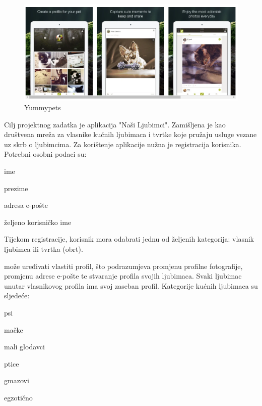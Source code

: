 		\begin{figure}[H]
			\includegraphics[scale=0.4]{slike/Yummypets.PNG} %
			\centering
			\caption{Yummypets}
			\label{fig:promjene}
		\end{figure}
	
		\par Cilj projektnog zadatka je aplikacija "Naši Ljubimci". Zamišljena je kao društvena mreža za vlasnike kućnih ljubimaca i tvrtke koje pružaju usluge vezane uz skrb o ljubimcima. Za korištenje aplikacije nužna je registracija korisnika. Potrebni osobni podaci su:
		
		
		\begin{packed_item}
			\item ime
			\item prezime
			\item adresa e-pošte
			\item željeno korisničko ime
		\end{packed_item}
		
		\par Tijekom registracije, korisnik mora odabrati jednu od željenih kategorija: vlasnik ljubimca ili tvrtka (obrt). 
		\par {} može uređivati vlastiti profil, što podrazumjeva promjenu profilne fotografije, promjenu adrese e-pošte te stvaranje profila svojih ljubimaca. Svaki ljubimac unutar vlasnikovog profila ima svoj zaseban profil. Kategorije kućnih ljubimaca su sljedeće:
		
		\begin{packed_item}
			\item psi
			\item mačke
			\item mali glodavci
			\item ptice
			\item gmazovi
			\item egzotično 
		\end{packed_item}
	
